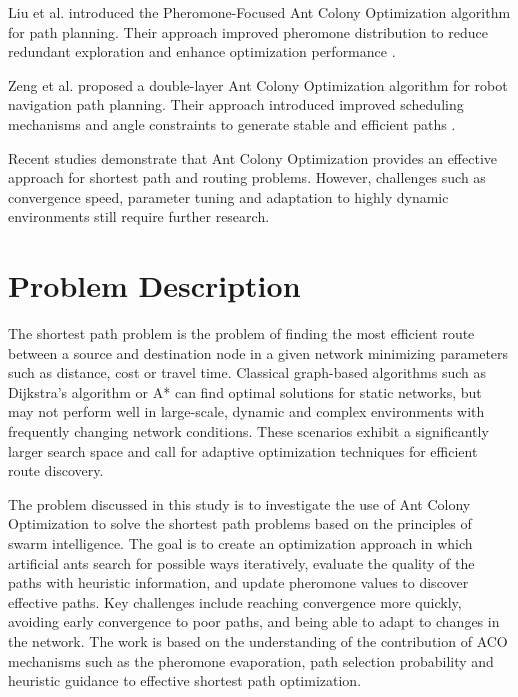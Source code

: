 \documentclass[conference]{IEEEtran}
\begin{document}
Liu et al. introduced the Pheromone-Focused Ant Colony Optimization algorithm for path planning. Their approach improved pheromone distribution to reduce redundant exploration and enhance optimization performance \cite{pfaco2026}.

Zeng et al. proposed a double-layer Ant Colony Optimization algorithm for robot navigation path planning. Their approach introduced improved scheduling mechanisms and angle constraints to generate stable and efficient paths \cite{idlaco2026}.

Recent studies demonstrate that Ant Colony Optimization provides an effective approach for shortest path and routing problems. However, challenges such as convergence speed, parameter tuning and adaptation to highly dynamic environments still require further research.


\section{Problem Description}

The shortest path problem is the problem of finding the most efficient route between a source and destination node in a given network minimizing parameters such as distance, cost or travel time. Classical graph-based algorithms such as Dijkstra’s algorithm or A* can find optimal solutions for static networks, but may not perform well in large-scale, dynamic and complex environments with frequently changing network conditions. These scenarios exhibit a significantly larger search space and call for adaptive optimization techniques for efficient route discovery.

The problem discussed in this study is to investigate the use of Ant Colony Optimization to solve the shortest path problems based on the principles of swarm intelligence. The goal is to create an optimization approach in which artificial ants search for possible ways iteratively, evaluate the quality of the paths with heuristic information, and update pheromone values to discover effective paths. Key challenges include reaching convergence more quickly, avoiding early convergence to poor paths, and being able to adapt to changes in the network. The work is based on the understanding of the contribution of ACO mechanisms such as the pheromone evaporation, path selection probability and heuristic guidance to effective shortest path optimization.




\end{document}
